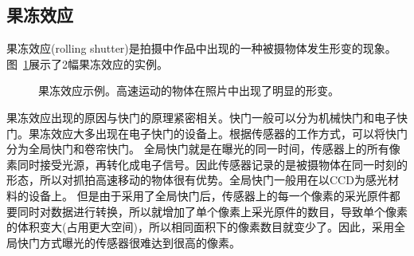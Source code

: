 \documentclass{ctexart}
\begin{document}
\subsection{果冻效应~\cite{rolling_shutter}}
果冻效应(rolling shutter)是拍摄中作品中出现的一种被摄物体发生形变的现象。图~\ref{fig_rolling_shutter_exp}展示了2幅果冻效应的实例。
\begin{figure}[htbp]
    \centering
    \caption{果冻效应示例。高速运动的物体在照片中出现了明显的形变。}
    \label{fig_rolling_shutter_exp}
\end{figure}
果冻效应出现的原因与快门的原理紧密相关。快门一般可以分为机械快门和电子快门。果冻效应大多出现在电子快门的设备上。根据传感器的工作方式，可以将快门分为全局快门和卷帘快门。
全局快门就是在曝光的同一时间，传感器上的所有像素同时接受光源，再转化成电子信号。因此传感器记录的是被摄物体在同一时刻的形态，所以对抓拍高速移动的物体很有优势。全局快门一般用在以CCD为感光材料的设备上。
但是由于采用了全局快门后，传感器上的每一个像素的采光原件都要同时对数据进行转换，所以就增加了单个像素上采光原件的数目，导致单个像素的体积变大(占用更大空间)，所以相同面积下的像素数目就变少了。因此，采用全局快门方式曝光的传感器很难达到很高的像素。
\end{document}
